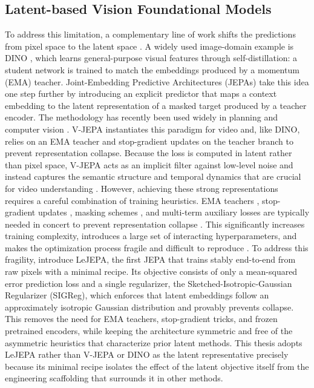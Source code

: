 \documentclass[11pt, a4paper]{article}
\begin{document}
\subsection{Latent-based Vision Foundational Models}
To address this limitation, a complementary line of work shifts the predictions from pixel space to the latent space \parencite{LeCun2022APT}. A widely used image-domain example is DINO \parencite{caron-2021}, which learns general-purpose visual features through self-distillation: a student network is trained to match the embeddings produced by a momentum (EMA) teacher. Joint-Embedding Predictive Architectures (JEPAs) \parencite{LeCun2022APT} take this idea one step further by introducing an explicit predictor that maps a context embedding to the latent representation of a masked target produced by a teacher encoder. The methodology has recently been used widely in planning and computer vision \parencite{NEURIPS2024_9c3828ad,fei-2023, bardes-2023, abdelfattah-2024, larey-2026, munim-2026}. V-JEPA \parencite{assran-2025} instantiates this paradigm for video and, like DINO, relies on an EMA teacher and stop-gradient updates on the teacher branch to prevent representation collapse. Because the loss is computed in latent rather than pixel space, V-JEPA acts as an implicit filter against low-level noise and instead captures the semantic structure and temporal dynamics that are crucial for video understanding \parencite{wu-2026}. However, achieving these strong representations requires a careful combination of training heuristics. EMA teachers \parencite{grill-2020, caron-2021}, stop-gradient updates \parencite{chen-2021}, masking schemes \parencite{zhou-2022, baevski-2022}, and multi-term auxiliary losses \parencite{oquab-2023} are typically needed in concert to prevent representation collapse \parencite{maes-2026}. This significantly increases training complexity, introduces a large set of interacting hyperparameters, and makes the optimization process fragile and difficult to reproduce \parencite{wagner-2022}. To address this fragility, \textcite{balestriero-2025} introduce LeJEPA, the first JEPA that trains stably end-to-end from raw pixels with a minimal recipe. Its objective consists of only a mean-squared error prediction loss and a single regularizer, the Sketched-Isotropic-Gaussian Regularizer (SIGReg), which enforces that latent embeddings follow an approximately isotropic Gaussian distribution and provably prevents collapse. This removes the need for EMA teachers, stop-gradient tricks, and frozen pretrained encoders, while keeping the architecture symmetric and free of the asymmetric heuristics that characterize prior latent methods. This thesis adopts LeJEPA rather than V-JEPA or DINO as the latent representative precisely because its minimal recipe isolates the effect of the latent objective itself from the engineering scaffolding that surrounds it in other methods.
\end{document}
